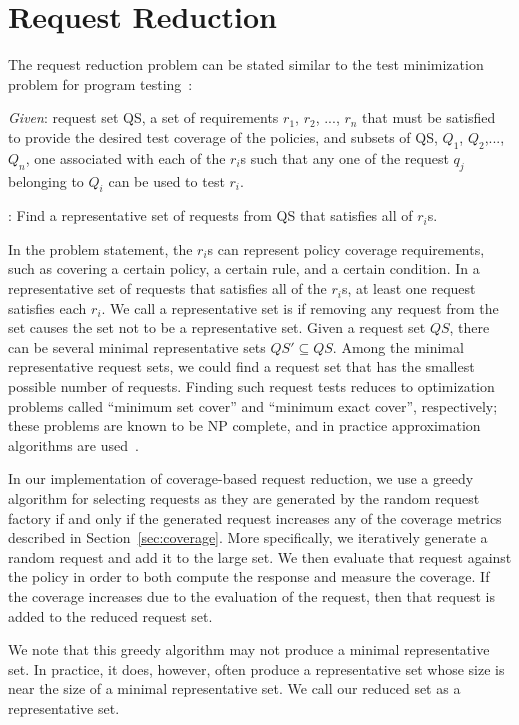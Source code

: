 \section{Request Reduction}
\label{sec:reqreduce}

The request reduction problem can be stated similar to the test
minimization problem for program
testing~\cite{harrold93:methodology}:

\vspace{5mm}\noindent
 {\it Given}: request set QS, a set of requirements $r_1$, $r_2$, ..., $r_n$
 that must be satisfied to provide the desired test coverage of the
 policies, and subsets of QS, $Q_1$, $Q_2$,..., $Q_n$, one associated
 with each of the $r_i$s such that any one of the request $q_j$ belonging
 to $Q_i$ can be used to test $r_i$.

: Find a representative set of requests from
QS that satisfies all
 of $r_i$s.

\vspace{5mm}

In the problem statement, the $r_i$s can represent policy coverage
requirements, such as covering a certain policy, a certain rule,
and a certain condition. In a representative set of requests that
satisfies all of the $r_i$s, at least one request satisfies each
$r_i$. We call a representative set is  if removing
any request from the set causes the set not to be a representative
set. Given a request set $QS$, there can be several minimal
representative sets $QS' \subseteq QS$. Among the minimal
representative request sets, we could find a request set that has
the smallest possible number of requests. Finding such request
tests reduces to optimization problems called ``minimum set
cover'' and ``minimum exact cover'', respectively; these problems
are known to be NP complete, and in practice approximation
algorithms are used~\cite{johnson74:approximation}.

In our implementation of coverage-based request reduction, we use a
greedy algorithm for selecting requests as they are generated by the
random request factory if and only if the generated request
increases any of the coverage metrics described in
Section~\ref{sec:coverage}. More specifically, we iteratively
generate a random request and add it to the large set. We then
evaluate that request against the policy in order to both compute
the response and measure the coverage. If the coverage increases due
to the evaluation of the request, then that request is added to the
reduced request set.

We note that this greedy algorithm may not produce a minimal
representative set. In practice, it does, however, often produce a
representative set whose size is near the size of a minimal
representative set. We call our reduced set as a  representative set.


